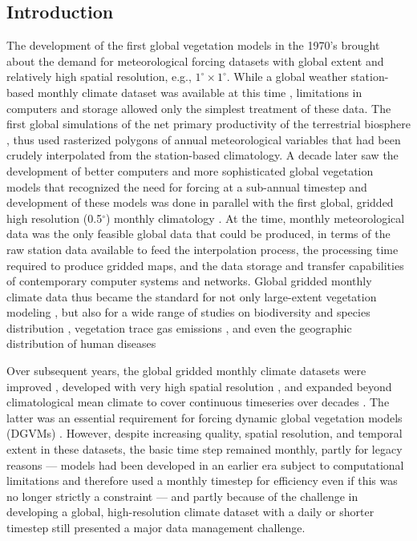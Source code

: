 \begin{refsection}
\section{Introduction} \label{sec:gwgen-intro}

The development of the first global vegetation models in the 1970’s \citep[e.g.,][]{Lieth1975} brought about the demand for meteorological forcing datasets with global extent and relatively high spatial resolution, e.g., $1^{\circ}\times1^{\circ}$. While a global weather station-based monthly climate dataset was available at this time \citep{WalterLieth1967}, limitations in computers and storage allowed only the simplest treatment of these data. The first global simulations of the net primary productivity of the terrestrial biosphere \citep{Lieth1975}, thus used rasterized polygons of annual meteorological variables that had been crudely interpolated from the station-based climatology. A decade later saw the development of better computers and more sophisticated global vegetation models \citep{PrenticeCramerHarrisonEtAl1992, Prentice1989} that recognized the need for forcing at a sub-annual timestep and development of these models was done in parallel with the first global, gridded high resolution (0.5$^{\circ}$) monthly climatology \citep{LeemansCramer1991}. At the time, monthly meteorological data was the only feasible global data that could be produced, in terms of the raw station data available to feed the interpolation process, the processing time required to produce gridded maps, and the data storage and transfer capabilities of contemporary computer systems and networks. Global gridded monthly climate data thus became the standard for not only large-extent vegetation modeling \citep{HaxeltinePrentice1996a, HaxeltinePrenticeCreswell1996,KaplanBigelowPrenticeEtAl2003, KucharikFoleyDelireEtAl2000, WoodwardSmithEmanuel1995}, but also for a wide range of studies on biodiversity and species distribution \citep[e.g.,][]{ElithGrahamAndersonEtAl2006}, vegetation trace gas emissions \citep[e.g.,][]{GuentherHewittEricksonEtAl1995}, and even the geographic distribution of human diseases \citep[e.g.,][]{BhattGethingBradyEtAl2013}

Over subsequent years, the global gridded monthly climate datasets were improved \citep{NewHulmeJones1999,NewListerHulmeEtAl2002}, developed with very high spatial resolution \citep{HijmansCameronParraEtAl2005}, and expanded beyond climatological mean climate to cover continuous timeseries over decades \citep{HarrisJonesOsbornEtAl2014,MitchellJones2005,NewHulmeJones2000}. The latter was an essential requirement for forcing dynamic global vegetation models (DGVMs) \citep[e.g.,][]{SitchSmithPrenticeEtAl2003}. However, despite increasing quality, spatial resolution, and temporal extent in these datasets, the basic time step remained monthly, partly for legacy reasons --- models had been developed in an earlier era subject to computational limitations and therefore used a monthly timestep for efficiency even if this was no longer strictly a constraint --- and partly because of the challenge in developing a global, high-resolution climate dataset with a daily or shorter timestep still presented a major data management challenge.


\end{refsection}
